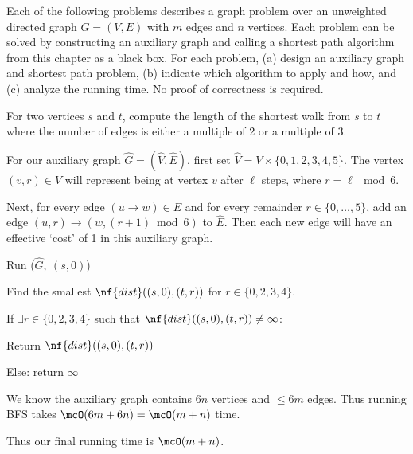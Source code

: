 \documentclass{article}
\begin{document}
 Each of the following problems describes a graph problem over an unweighted directed graph $G = (V, E)$ with $m$ edges and $n$ vertices.
Each problem can be solved by constructing an auxiliary graph and calling a shortest path algorithm from this chapter as a black box.
For each problem, (a) design an auxiliary graph and shortest path problem, (b) indicate which algorithm to apply and how, and (c) analyze the running time.
No proof of correctness is required.
\setcounter{section}{7}
\setcounter{exercise}{1}
\setcounter{subexercise}{2}
\begin{subexercise} %
  For two vertices $s$ and $t$, compute the length of the shortest walk from $s$ to $t$ where the number of edges is either a multiple of 2 or a multiple of 3.
\end{subexercise}

\begin{solution}
\begin{enumerate}[label=(\alph*)]
  \item For our auxiliary graph $ \hat G=(\hat V,\hat E) $, first set $\hat V =V\times\{0,1,2,3,4,5\}$.
  The vertex $(v,r)\in\hat V$ will represent being at vertex $ v $ after $ \ell $ steps, where $ r = \ell\mod 6 $.

  Next, for every edge $(u \to w)\in E$ and for every remainder $r\in \{0,\dots,5\}$, add an edge $(u, r)\to(w, (r+1)\bmod 6)$ to $ \hat E $.
  Then each new edge will have an effective `cost' of 1 in this auxiliary graph.
  \item {}
  \begin{steps}
    \item Run ($ \hat G,\ (s,0) $)
    \item Find the smallest $ \nf{dist}((s,0),(t,r)) $ for $ r \in \{0,2,3,4\} $.
    \item If $ \exists r\in\{0,2,3,4\} $ such that $ \nf{dist}((s,0),(t,r)) \neq \infty$: \begin{steps}
      \item Return $ \nf{dist}((s,0),(t,r)) $
    \end{steps}
    \item Else: return $ \infty $
  \end{steps}

  \item We know the auxiliary graph contains $ 6n $ vertices and $ \leq 6m $ edges. Thus running BFS takes $ \mcO(6m+6n) = \mcO(m+n) $ time.

  Thus our final running time is $ \mcO(m+n) $.
\end{enumerate}
\end{solution}
\pagebreak
\end{document}

